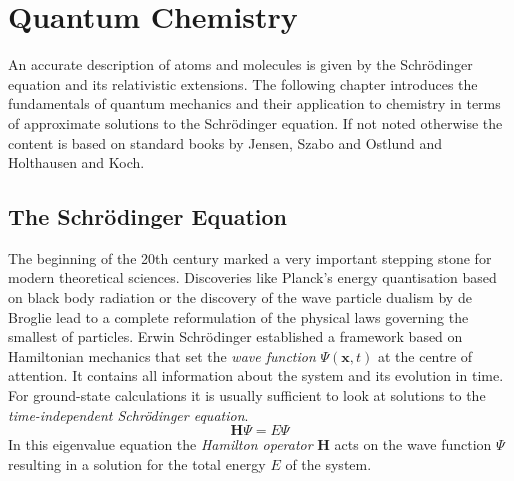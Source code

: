 
\chapter{Quantum Chemistry}
\label{sec:basicsofQC}

An accurate description of atoms and molecules is given by the
Schr\"odinger equation and its relativistic extensions. The following chapter introduces the fundamentals of
quantum mechanics and their application to chemistry in terms of approximate
solutions to the Schr\"odinger equation. If not noted otherwise the content is
based on standard books by
Jensen\autocite{Jensen_IntroductionComputationalChemistry_2007}, Szabo and
Ostlund\autocite{Szabo_ModernQuantumChemistry_1996} and Holthausen and
Koch\autocite{Koch_ChemistGuideDensity_2001}.

\section{The Schr\"odinger Equation}
\label{sec:schrodingerequation}

The beginning of the 20th century marked a very important stepping stone for
modern theoretical sciences. Discoveries like Planck's energy quantisation
based on black body
radiation\autocite{Planck_UeberGesetzEnergieverteilung_1901} or the discovery
of the wave particle dualism by de
Broglie\autocite{Broglie_RecherchestheorieQuanta_1925} lead to a complete
reformulation of the physical laws governing the smallest of particles. Erwin
Schr\"odinger established a framework based on Hamiltonian mechanics that set
the \textit{wave function} $\Psi(\mathbf{x},t)$ at the centre of
attention.\autocite{Schrodinger_QuantisierungalsEigenwertproblem_1926} It
contains all information about the system and its evolution in time. For
ground-state calculations it is usually sufficient to look at solutions to the
\textit{time-independent Schr\"odinger equation}.
%
\begin{equation}
	\mathbf{H}\Psi=E\Psi\label{eqn:SchrodingerEquation}
\end{equation}%
%
In this eigenvalue equation the \textit{Hamilton operator} $\mathbf{H}$ acts on
the wave function $\Psi$ resulting in a solution for the total energy $E$ of the
system. 

